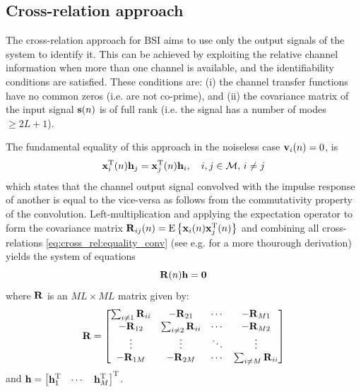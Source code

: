 \documentclass{article}
\newcommand{\h}{\mtxb{h}}
\newcommand{\x}{\mtxb{x}}
\newcommand{\R}{\mtxb{R}}
\newcommand{\Mset}{\mathcal{M}}
\begin{document}
\subsection{Cross-relation approach}
\label{ssec:cross_rel}
The cross-relation approach for BSI aims to use only the output signals of the system to identify it.
This can be achieved by exploiting the relative channel information when more than one channel is available, and the identifiability conditions \cite{guanghanxuLeastsquaresApproachBlind1995} are satisfied. These conditions are: (i) the channel transfer functions have no common zeros (i.e. are not co-prime), and (ii) the covariance matrix of the input signal \(\bm{\mathrm{s}}(n)\) is of full rank (i.e. the signal has a number of modes \(\geq 2L+1\)).

The fundamental equality of this approach in the noiseless case \(\bm{\mathrm{v}}_i(n) = 0\), is 
\begin{equation}
    \x_i^{\T}(n) \h_j = \x_j^{\T}(n) \h_i,\quad i,j \in \Mset,\,i\neq j\label{eq:cross_rel:equality_conv}
\end{equation}
which states that the channel output signal convolved with the impulse response of another is equal to the vice-versa as follows from the commutativity property of the convolution.
Left-multiplication and applying the expectation operator to form the covariance matrix \(\R_{ij}(n) = \ev{\x_i(n) \x_j^\T(n)}\) and combining all cross-relations \eqref{eq:cross_rel:equality_conv} (see e.g. \cite{huangAdaptiveMultichannelLeast2002} for a more thourough derivation) yields the system of equations  
\begin{equation}
    \R(n) \h = \bm{0} \label{eq:cross_rel:null_space}\\
\end{equation}
where \(\R\) is an \(M L \times M L\) matrix given by:
\begin{equation}
    \R = \begin{bmatrix}
        \sum_{i \neq 1} \R_{ii} & -\R_{21} & \cdots & -\R_{M1}\\
        -\R_{12} & \sum_{i \neq 2} \R_{ii} & \cdots & -\R_{M2}\\
        \vdots & \vdots & \ddots & \vdots\\
        -\R_{1M} & -\R_{2M} & \cdots & \sum_{i \neq M} \R_{ii}\\
    \end{bmatrix}\label{eq:cross_rel:data_matrix}
\end{equation}
and \(\h = \begin{bmatrix}
    \h_1^\T & \cdots & \h_M^\T
\end{bmatrix}^\T\).
\end{document}
